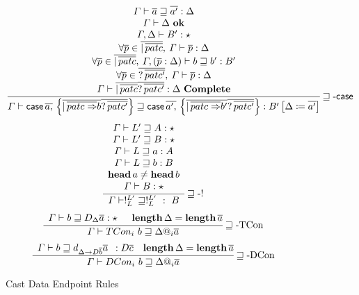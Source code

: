 \begin{figure}
\[
\frac{\begin{array}{c}
\varGamma\vdash\overline{a}\sqsupseteq\overline{a'}:\Delta\\
\varGamma\vdash\Delta\ \mathbf{ok}\\
\varGamma,\Delta\vdash B':\star\\
\forall\overline{p}\in\overline{|\,\overline{patc}},\:\varGamma\vdash\overline{p}:\Delta\\
\forall\overline{p}\in\overline{|\,\overline{patc}},\:\varGamma,\left(\overline{p}:\Delta\right)\vdash b\sqsupseteq b':B'\\
\forall\overline{p}\in\overline{?\,\overline{patc'}},\:\varGamma\vdash\overline{p}:\Delta\\
\varGamma\vdash\overline{|\,\overline{patc}}\overline{?\,\overline{patc'}}:\Delta\ \mathbf{Complete}
\end{array}}{
  \varGamma\vdash\mathsf{case}\,\overline{a,}\,\left\{ \overline{|\,\overline{patc\Rightarrow}b} \overline{?\,\overline{patc'}} \right\} \sqsupseteq\mathsf{case}\,\overline{a',}\,\left\{ \overline{|\,\overline{patc\Rightarrow}b'} \overline{?\,\overline{patc'}} \right\} :B'\left[\Delta\coloneqq\overline{a'}\right]
  }\rulename{\sqsupseteq-\mathsf{case}}
\]
\[
\frac{\begin{array}{c}
\varGamma\vdash L'\sqsupseteq A:\star\\
\varGamma\vdash L'\sqsupseteq B:\star\\
\varGamma\vdash L\sqsupseteq a:A\\
\varGamma\vdash L\sqsupseteq b:B\\
\mathbf{head}\,a\neq\mathbf{head}\,b\\
\varGamma\vdash B:\star
\end{array}}{\varGamma\vdash!_{L}^{L'}\sqsupseteq!_{L}^{L'}\ :\ B
}\operatorname{\sqsupseteq-!}
\]
\[
\frac{\begin{array}{c}
\varGamma\vdash b\sqsupseteq D_{\Delta}\overline{a}:\star\end{array}\quad\mathbf{length}\,\Delta=\mathbf{length}\,\overline{a}}{\varGamma\vdash TCon_{i}\ b\sqsupseteq\Delta@_{i}\overline{a}
}\rulename{\sqsupseteq-TCon}
\]
\[
\frac{\begin{array}{c}
\varGamma\vdash b\sqsupseteq d_{\Delta\rightarrow D\overline{b}}\overline{a}\end{array}:D\overline{c}\quad\mathbf{length}\,\Delta=\mathbf{length}\,\overline{a}}{\varGamma\vdash DCon_{i}\ b\sqsupseteq\Delta@_{i}\overline{a}
}\rulename{\sqsupseteq-DCon}
\]
  
\caption{Cast Data Endpoint Rules}
\label{fig:cast-Data-Endpoint-Rules}
\end{figure}

